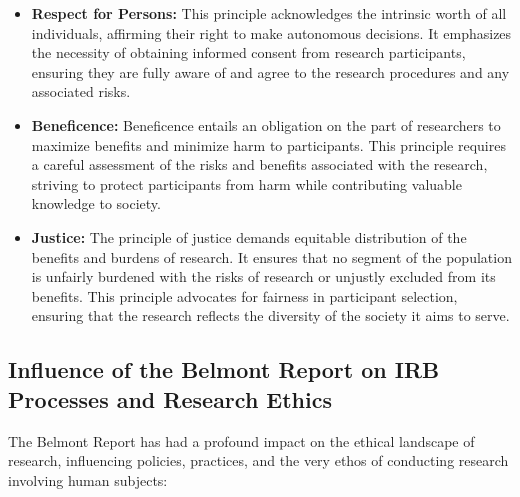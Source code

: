 \documentclass[
]{book}
\begin{document}
\begin{itemize}
\item
  \textbf{Respect for Persons:} This principle acknowledges the intrinsic worth of all individuals, affirming their right to make autonomous decisions. It emphasizes the necessity of obtaining informed consent from research participants, ensuring they are fully aware of and agree to the research procedures and any associated risks.
\item
  \textbf{Beneficence:} Beneficence entails an obligation on the part of researchers to maximize benefits and minimize harm to participants. This principle requires a careful assessment of the risks and benefits associated with the research, striving to protect participants from harm while contributing valuable knowledge to society.
\item
  \textbf{Justice:} The principle of justice demands equitable distribution of the benefits and burdens of research. It ensures that no segment of the population is unfairly burdened with the risks of research or unjustly excluded from its benefits. This principle advocates for fairness in participant selection, ensuring that the research reflects the diversity of the society it aims to serve.
\end{itemize}

\hypertarget{influence-of-the-belmont-report-on-irb-processes-and-research-ethics}{%
\subsection*{Influence of the Belmont Report on IRB Processes and Research Ethics}\label{influence-of-the-belmont-report-on-irb-processes-and-research-ethics}}

The Belmont Report has had a profound impact on the ethical landscape of research, influencing policies, practices, and the very ethos of conducting research involving human subjects:
\end{document}
